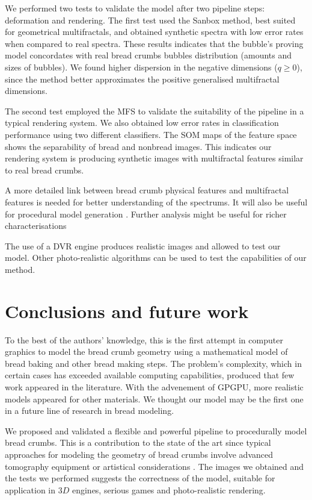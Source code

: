\documentclass[final,5p,times]{elsarticle}
\begin{document}
We performed two tests to validate the model after two pipeline steps: deformation and rendering. The first test used the Sanbox method, best suited for geometrical multifractals, and obtained synthetic spectra with low error rates when compared to real spectra.  These results indicates that the bubble's proving model concordates with real bread crumbs bubbles distribution (amounts and sizes of bubbles). 
We found higher dispersion in the negative dimensions ($q \ge 0$), since the method better approximates the positive generalised multifractal dimensions. 

The second test employed the MFS to validate the suitability of the pipeline in a typical rendering system. We also obtained low error rates in classification performance using two different classifiers. The SOM maps of the feature space shows the separability of bread and nonbread images. This indicates our rendering system is producing synthetic images with multifractal features similar to real bread crumbs.

A more detailed link between bread crumb physical features and multifractal features is needed for better understanding of the spectrums. It will also be useful for procedural model generation \cite{Baravalle2012}. Further analysis might be useful for richer characterisations

The use of a DVR engine produces realistic images and allowed to test our model. Other photo-realistic algorithms can be used to test the capabilities of our method.


\section{Conclusions and future work}


To the best of the authors' knowledge, this is the first attempt in computer graphics to model the bread crumb geometry using a mathematical model of bread baking and other bread making steps. The problem's complexity, which in certain cases has exceeded available computing capabilities, produced that few work appeared in the literature. With the advenement of GPGPU, more realistic models appeared for other materials. We thought our model may be the first one in a future line of research in bread modeling. 

We proposed and validated a flexible and powerful pipeline to procedurally model bread crumbs. This is a contribution to the state of the art since typical approaches for modeling the geometry of bread crumbs involve advanced tomography equipment \cite{VanDyck2014} or artistical considerations \cite{Cho2007}. The images we obtained and the tests we performed  suggests the correctness of the model, suitable for application in $3D$ engines, serious games and photo-realistic rendering.
\end{document}
